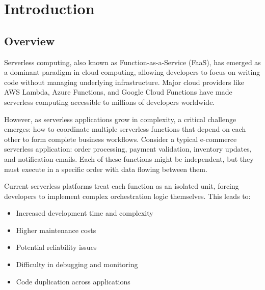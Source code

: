 \documentclass{fisatprojectfinal}
\begin{document}
\thispagestyle{empty}
\restoregeometry
\newpage

\thispagestyle{empty}
\setcounter{page}{0}
\tableofcontents

\thispagestyle{empty}
\newpage

\cleardoublepage
{}
\thispagestyle{empty}
\listoffigures
\thispagestyle{empty}
\newpage

\cleardoublepage
{}
\thispagestyle{empty}
\listoftables
\thispagestyle{empty}
\newpage

\chapter{Introduction}
\setcounter{page}{1}
\renewcommand{\baselinestretch}{1.50}

\section{Overview}
Serverless computing, also known as Function-as-a-Service (FaaS), has emerged as a dominant paradigm in cloud computing, allowing developers to focus on writing code without managing underlying infrastructure. Major cloud providers like AWS Lambda, Azure Functions, and Google Cloud Functions have made serverless computing accessible to millions of developers worldwide.

However, as serverless applications grow in complexity, a critical challenge emerges: how to coordinate multiple serverless functions that depend on each other to form complete business workflows. Consider a typical e-commerce serverless application: order processing, payment validation, inventory updates, and notification emails. Each of these functions might be independent, but they must execute in a specific order with data flowing between them.

Current serverless platforms treat each function as an isolated unit, forcing developers to implement complex orchestration logic themselves. This leads to:
\begin{itemize}
    \item Increased development time and complexity
    \item Higher maintenance costs
    \item Potential reliability issues
    \item Difficulty in debugging and monitoring
    \item Code duplication across applications
\end{itemize}
\end{document}
